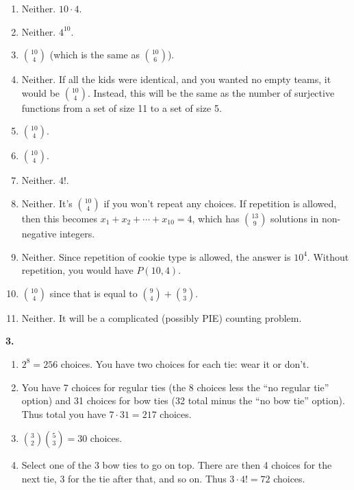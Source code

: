 \documentclass[10pt,]{book}
\theoremstyle{plain}
\theoremstyle{definition}
\theoremstyle{definition}
\theoremstyle{definition}
\numberwithin{equation}{section}
\begin{document}
\begin{enumerate}[label=(\alph*)]
\item\hypertarget{li-708}{}
                  Neither. \(10\cdot 4\).
\item\hypertarget{li-709}{}
                  Neither. \(4^{10}\).
\item\hypertarget{li-710}{}\({10 \choose 4}\) (which is the same as \({10 \choose 6}\)).%
\item\hypertarget{li-711}{}
                  Neither. If all the kids were identical, and you wanted no empty teams, it would be \({10 \choose 4}\). Instead, this will be the same as the number of surjective functions from a set of size 11 to a set of size 5.
\item\hypertarget{li-712}{}\({10 \choose 4}\).%
\item\hypertarget{li-713}{}\({10 \choose 4}\).%
\item\hypertarget{li-714}{}
                  Neither. \(4!\).
\item\hypertarget{li-715}{}
                  Neither. It's \({10 \choose 4}\) if you won't repeat any choices. If repetition is allowed, then this becomes \(x_1 + x_2 + \cdots +x_{10} = 4\), which has \({13 \choose 9}\) solutions in non-negative integers.
\item\hypertarget{li-716}{}
                  Neither. Since repetition of cookie type is allowed, the answer is \(10^4\). Without repetition, you would have \(P(10,4)\).
\item\hypertarget{li-717}{}\({10 \choose 4}\) since that is equal to \({9 \choose 4} + {9 \choose 3}\).%
\item\hypertarget{li-718}{}
                  Neither. It will be a complicated (possibly PIE) counting problem.
\end{enumerate}

\par\smallskip
\noindent\textbf{3.}\quad{} \leavevmode%
\begin{enumerate}[label=(\alph*)]
\item\hypertarget{li-723}{}\(2^8 = 256\) choices. You have two choices for each tie: wear it or don't.%
\item\hypertarget{li-724}{}
                You have 7 choices for regular ties (the 8 choices less the ``no regular tie'' option) and 31 choices for bow ties (32 total minus the ``no bow tie'' option). Thus total you have \(7 \cdot 31 = 217\) choices.
\item\hypertarget{li-725}{}\({3\choose 2}{5\choose 3} = 30\) choices.%
\item\hypertarget{li-726}{}
                Select one of the 3 bow ties to go on top. There are then 4 choices for the next tie, 3 for the tie after that, and so on. Thus \(3\cdot 4! = 72\) choices.
\end{enumerate}
\end{document}
